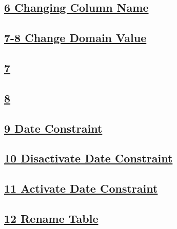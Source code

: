 \vspace{0.35cm}
\subsection*{\underline{6 Changing Column Name}}


\vspace{0.35cm}
\subsection*{\underline{7-8 Change Domain Value}}
\subsection*{\underline{7}}

\vspace{0.15cm}

\subsection*{\underline{8}}


\vspace{0.35cm}

\subsection*{\underline{9 Date Constraint}}

\vspace{0.35cm}

\subsection*{\underline{10 Disactivate Date Constraint}}

\vspace{0.35cm}

\subsection*{\underline{11 Activate Date Constraint}}

\vspace{0.35cm}

\subsection*{\underline{12 Rename Table}}

\vspace{0.35cm}

